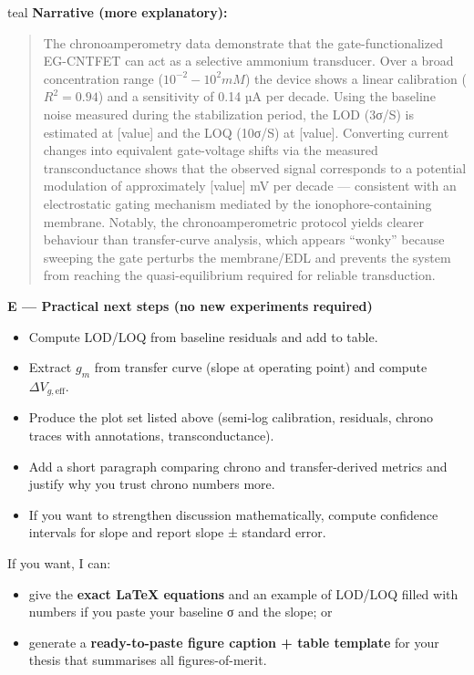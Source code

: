 \begin{color}{teal}
\textbf{Narrative (more explanatory):}
\begin{quote}
The chronoamperometry data demonstrate that the gate-functionalized EG-CNTFET can act as a selective ammonium transducer. Over a broad concentration range ($10^{-2}-10^2 mM$) the device shows a linear calibration (\(R^{2} = 0.94\)) and a sensitivity of 0.14 µA per decade. Using the baseline noise measured during the stabilization period, the LOD (3σ/S) is estimated at [value] and the LOQ (10σ/S) at [value]. Converting current changes into equivalent gate-voltage shifts via the measured transconductance shows that the observed signal corresponds to a potential modulation of approximately [value] mV per decade — consistent with an electrostatic gating mechanism mediated by the ionophore-containing membrane. Notably, the chronoamperometric protocol yields clearer behaviour than transfer-curve analysis, which appears “wonky” because sweeping the gate perturbs the membrane/EDL and prevents the system from reaching the quasi-equilibrium required for reliable transduction.
\end{quote}

\bigskip

\noindent\textbf{E — Practical next steps (no new experiments required)}
\begin{itemize}
    \item Compute LOD/LOQ from baseline residuals and add to table.  
    \item Extract \(g_m\) from transfer curve (slope at operating point) and compute \(\Delta V_{g,\text{eff}}\).  
    \item Produce the plot set listed above (semi-log calibration, residuals, chrono traces with annotations, transconductance).  
    \item Add a short paragraph comparing chrono and transfer-derived metrics and justify why you trust chrono numbers more.  
    \item If you want to strengthen discussion mathematically, compute confidence intervals for slope and report slope ± standard error.
\end{itemize}

\bigskip

If you want, I can:
\begin{itemize}
    \item give the \textbf{exact LaTeX equations} and an example of LOD/LOQ filled with numbers if you paste your baseline σ and the slope; or
    \item generate a \textbf{ready-to-paste figure caption + table template} for your thesis that summarises all figures-of-merit.
\end{itemize}

\end{color}

